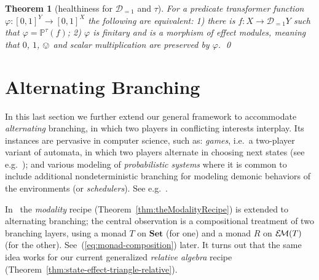 \documentclass[9pt, preprint]{sigplanconf}
\theoremstyle{theorem}
\newtheorem{theorem}{Theorem}[section]
\newtheorem{proposition}[theorem]{Proposition}
\theoremstyle{definition}
\renewcommand{\phi}{\varphi}
\newcommand{\dist}{\mathcal{D}_{=1}}
\newcommand{\sdist}{\mathcal{D}_{\le 1}}
\newcommand{\uintv}{[0, 1]}
\newcommand{\Set}{\mathbf{Set}}
\newcommand{\Sets}{\Set}
\newcommand{\EM}{\mathcal{E}{\kern-.5ex}\mathcal{M}}
\newif\ifignore \ignorefalse
\newcommand{\auxproof}[1]{
\ifignore\mbox{}\newline
\textbf{BEGIN: AUX-PROOF} \dotfill\newline
{#1}\mbox{}\newline
\textbf{END: AUX-PROOF}\dotfill\newline
\fi}
\newcommand{\bbP}{\mathbb{P}}
\newcommand{\EMod}{\mathbf{EMod}}
\begin{document}
\begin{theorem}[healthiness for $\dist$ and $\tau$]
  For a predicate transformer function
  $\varphi \colon \uintv^Y \to \uintv^X$ the following are equivalent: 1)
  there is  $f\colon X\to \dist Y$ such that
  $\varphi = \bbP^{\tau}(f)$; 2) $\phi$ is finitary and is a morphism of
  effect modules, meaning that
  $0$, $1$, $\ovee$ and scalar
  multiplication are preserved by $\varphi$. \qed
\end{theorem}


\auxproof{
\subsection{Subdistribution Monad with Partial Modality}
\label{sub:subdist-monad-partial}


\subsection{Distribution Monad}
\label{sub:dist-monad}

As in the subdistribution case, we can define
a monad map $\sigma_X \colon \dist X \to \EMod(\uintv^X, \uintv)$
by integration, which is bijective when $X$ is finite.
The proposition below is proved similarly.

\begin{proposition}
  A predicate transformer $\phi \colon \uintv^Y \to \uintv^X$ comes from
  some $P \colon X \to \sdist Y$ if and only
  $\phi$ is finitary and an effect module morphism.
\end{proposition}


}


\section{Alternating Branching}
\label{sec:two-player-setting}
In this last section we  further extend our general framework to
accommodate \emph{alternating} branching, in which two players in
conflicting interests interplay. Its instances are  pervasive
in computer science, such as:  \emph{games}, i.e.\ a two-player variant
of automata, in which two players alternate in choosing next states (see
e.g.~\cite{Wilke01});
and various modeling of \emph{probabilistic systems} where it is
common to include additional nondeterministic branching for modeling
demonic behaviors of the environments (or \emph{schedulers}). See
e.g.~\cite{Sokolova05}.

In~\cite{Hasuo15TCS} the  \emph{modality} recipe
(Theorem~\ref{thm:theModalityRecipe}) is extended to alternating
branching; the central observation  is a compositional
treatment of two branching layers, using a monad $T$ on $\Sets$ (for
one)
and a monad $R$ on $\EM(T)$ (for the other). See~(\ref{eq:monad-composition}) later. It turns out that the same idea
works for our current generalized \emph{relative algebra} recipe
(Theorem~\ref{thm:state-effect-triangle-relative}).
\end{document}
